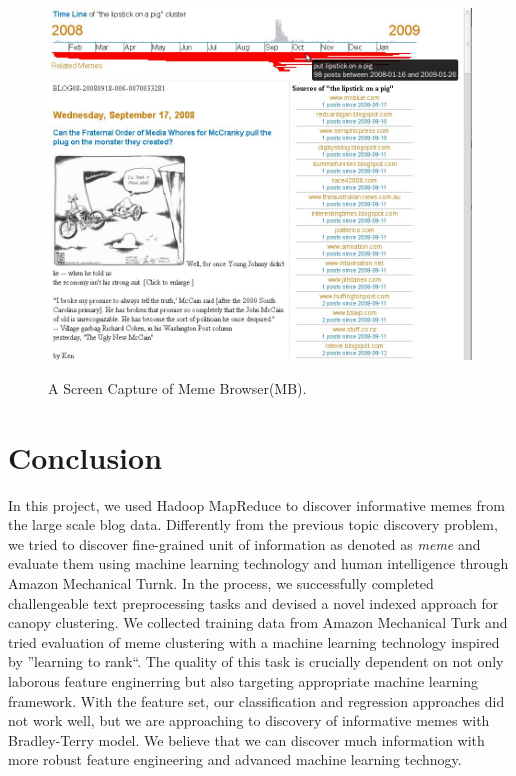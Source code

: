 \documentclass{sig-alternate}
\begin{document}
\begin{figure}[h!]
	\begin{center}
		{\includegraphics[width=\textwidth]{mockup.jpg}}
	\end{center}
	\caption{A Screen Capture of Meme Browser(MB).}
	\label{fig:mockup}
\end{figure}

\section{Conclusion}
In this project, we used Hadoop MapReduce to discover informative memes from the large scale blog data. Differently from the previous topic discovery problem, we tried to discover fine-grained unit of information as denoted as \emph{meme} and evaluate them using machine learning technology and human intelligence through Amazon Mechanical Turnk. In the process, we successfully completed challengeable text preprocessing tasks and devised a novel indexed approach for canopy clustering. We collected training data from Amazon Mechanical Turk and tried evaluation of meme clustering with a machine learning technology inspired by ''learning to rank``. The quality of this task is crucially dependent on not only laborous feature enginerring but also targeting appropriate machine learning framework. With the feature set, our classification and regression approaches did not work well, but we are approaching to discovery of informative memes with Bradley-Terry model. We believe that we can discover much information with more robust feature engineering and advanced machine learning technogy.

%

\end{document}
